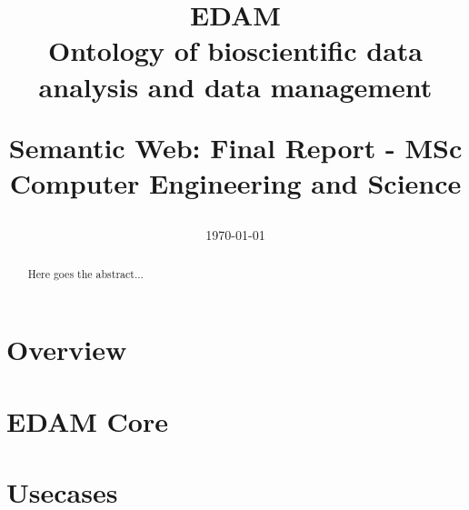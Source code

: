 \documentclass{scrartcl}
\title{EDAM
\\
Ontology of bioscientific data analysis and data management
\\
\begin{small} 
  Semantic Web: Final Report - 
  MSc Computer Engineering and Science
\end{small}
}
\author{
    \emailaddr{davide.domini@studio.unibo.it}
}
\date{\today}
\begin{document}
\maketitle

\begin{abstract}
    Here goes the abstract...
\end{abstract}


\newpage
\tableofcontents

\newpage
\listoffigures

\newpage

\section{Overview}

\section{EDAM Core}

\section{Usecases}


\newpage
{}
\printbibliography %
\end{document}
